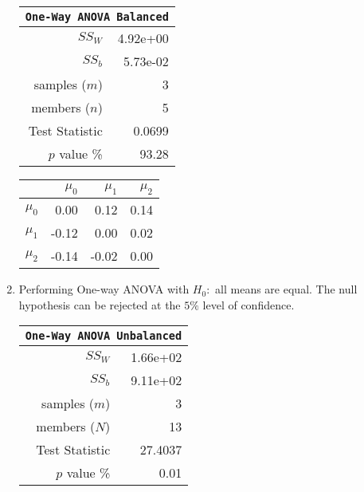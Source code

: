 \begin{enumerate}
	\begin{table}[H]
		\centering
		\begin{minipage}{0.4\textwidth}
			\centering
			\begin{tabular}{@{}rr@{}}
				\toprule
				\multicolumn{2}{c}{\texttt{One-Way ANOVA Balanced}} \\
				\midrule
				$SS_W$         &               4.92e+00 \\
				$SS_b$         &               5.73e-02 \\
				samples ($m$)  &                      3 \\
				members ($n$)  &                      5 \\
				Test Statistic &                 0.0699 \\
				$p$ value \%   &                  93.28 \\
				\bottomrule
			\end{tabular}
		\end{minipage}
		\begin{minipage}{0.4\textwidth}
			\centering
			\begin{tabular}{lrrr}
				\toprule
				{} &  $\mu_0$ &  $\mu_1$ &  $\mu_2$ \\
				\midrule
				$\mu_0$ &     0.00 &     0.12 &     0.14 \\
				$\mu_1$ &    -0.12 &     0.00 &     0.02 \\
				$\mu_2$ &    -0.14 &    -0.02 &     0.00 \\
				\bottomrule
			\end{tabular}
		\end{minipage}
	\end{table}

	\item Performing One-way ANOVA with $ H_0 : $ all means are equal. The null hypothesis can be rejected at the $ 5\% $ level of confidence.\\
	
	\begin{table}[H]
		\centering
		\begin{tabular}{@{}rr@{}}
			\toprule
			\multicolumn{2}{c}{\texttt{One-Way ANOVA Unbalanced}} \\
			\midrule
			$SS_W$         &               1.66e+02 \\
			$SS_b$         &               9.11e+02 \\
			samples ($m$)  &                      3 \\
			members ($N$)  &                     13 \\
			Test Statistic &                27.4037 \\
			$p$ value \%   &                   0.01 \\
			\bottomrule
		\end{tabular}
		

\end{table}
\end{enumerate}
